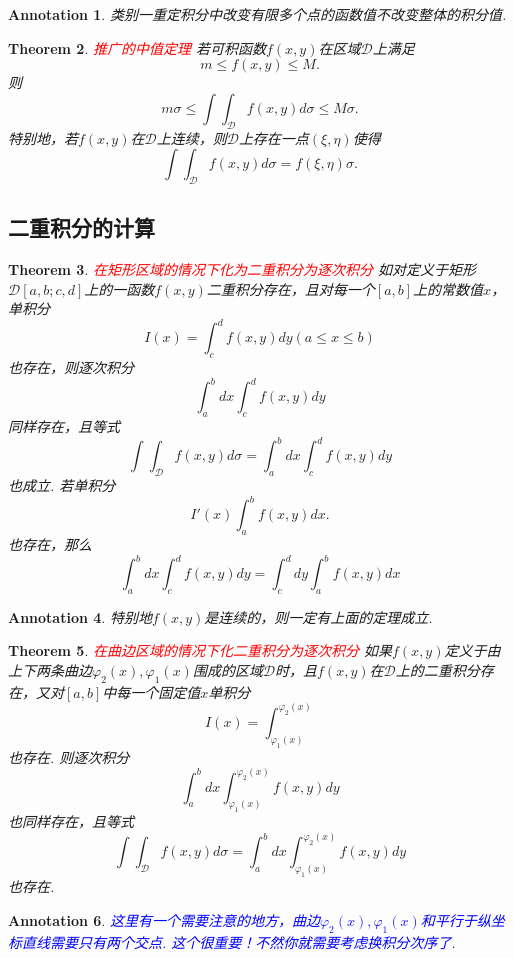 \documentclass{article}
\newtheorem{theorem}{Theorem}[section]
\newtheorem{annotation}[theorem]{Annotation}
\newcommand{\redt}[1]{\textcolor{red}{#1}}
\newcommand{\bluet}[1]{\textcolor{blue}{#1}}
\begin{document}
\begin{annotation}
\rm 类别一重定积分中改变有限多个点的函数值不改变整体的积分值.
\end{annotation}

\begin{theorem}
\rm \redt{推广的中值定理} 若可积函数$f(x,y)$在区域$\mathcal{D}$上满足
$$
m \leq f(x,y) \leq M.
$$
则
$$
m\sigma \leq \int\int_{\mathcal{D}}f(x,y)d\sigma \leq M\sigma.
$$
特别地，若$f(x,y)$在$\mathcal{D}$上连续，则$\mathcal{D}$上存在一点$(\xi,\eta)$使得
$$
\int\int_{\mathcal{D}}f(x,y)d\sigma = f(\xi,\eta)\sigma.
$$
\end{theorem}

\subsection{二重积分的计算}

\begin{theorem}
\rm \redt{在矩形区域的情况下化为二重积分为逐次积分} 如对定义于矩形$\mathcal{D}[a,b;c,d]$上的一函数$f(x,y)$二重积分存在，且对每一个$[a,b]$上的常数值$x$，单积分
$$
I(x) = \int_c^d f(x,y)dy (a \leq x \leq b)
$$
也存在，则逐次积分
$$
\int_a^b dx \int_c^d f(x,y)dy
$$
同样存在，且等式
$$
\int\int_{\mathcal{D}}f(x,y)d\sigma = \int_a^b dx \int_c^d f(x,y)dy
$$
也成立. 若单积分
$$
I'(x)\int_a^b f(x,y)dx.
$$
也存在，那么
$$
\int_a^b dx \int_c^d f(x,y)dy = \int_c^d dy \int_a^b f(x,y)dx
$$
\end{theorem}

\begin{annotation}
\rm 特别地$f(x,y)$是连续的，则一定有上面的定理成立.
\end{annotation}

\begin{theorem}
\rm \redt{在曲边区域的情况下化二重积分为逐次积分} 如果$f(x,y)$定义于由上下两条曲边$\varphi_2(x),\varphi_1(x)$围成的区域$\mathcal{D}$时，且$f(x,y)$在$\mathcal{D}$上的二重积分存在，又对$[a,b]$中每一个固定值$x$单积分
$$
I(x) = \int_{\varphi_1(x)}^{\varphi_2(x)}
$$ 
也存在. 则逐次积分
$$
\int_a^b dx \int_{\varphi_1(x)}^{\varphi_2(x)} f(x,y)dy
$$
也同样存在，且等式
$$
\int\int_{\mathcal{D}}f(x,y)d\sigma = \int_a^b dx \int_{\varphi_1(x)}^{\varphi_2(x)} f(x,y)dy
$$
也存在. 
\end{theorem}

\begin{annotation}
\rm \bluet{这里有一个需要注意的地方，曲边$\varphi_2(x),\varphi_1(x)$和平行于纵坐标直线需要只有两个交点. 这个很重要！不然你就需要考虑换积分次序了}.
\end{annotation}
\end{document}
